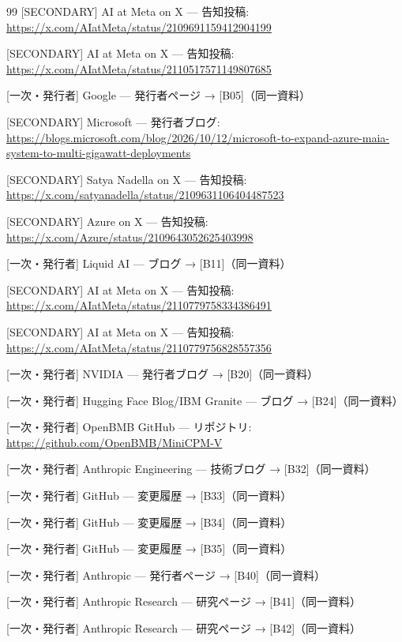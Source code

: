 \documentclass[lualatex,a4paper,10pt]{jlreq}
\begin{document}
\begin{thebibliography}{99}
 [SECONDARY] AI at Meta on X — 告知投稿: \url{https://x.com/AIatMeta/status/2109691159412904199}

 [SECONDARY] AI at Meta on X — 告知投稿: \url{https://x.com/AIatMeta/status/2110517571149807685}

 [一次・発行者] Google — 発行者ページ → [B05]（同一資料）

 [SECONDARY] Microsoft — 発行者ブログ: \url{https://blogs.microsoft.com/blog/2026/10/12/microsoft-to-expand-azure-maia-system-to-multi-gigawatt-deployments}

 [SECONDARY] Satya Nadella on X — 告知投稿: \url{https://x.com/satyanadella/status/2109631106404487523}

 [SECONDARY] Azure on X — 告知投稿: \url{https://x.com/Azure/status/2109643052625403998}

 [一次・発行者] Liquid AI — ブログ → [B11]（同一資料）

 [SECONDARY] AI at Meta on X — 告知投稿: \url{https://x.com/AIatMeta/status/2110779758334386491}

 [SECONDARY] AI at Meta on X — 告知投稿: \url{https://x.com/AIatMeta/status/2110779756828557356}

 [一次・発行者] NVIDIA — 発行者ブログ → [B20]（同一資料）

 [一次・発行者] Hugging Face Blog/IBM Granite — ブログ → [B24]（同一資料）

 [一次・発行者] OpenBMB GitHub — リポジトリ: \url{https://github.com/OpenBMB/MiniCPM-V}

 [一次・発行者] Anthropic Engineering — 技術ブログ → [B32]（同一資料）

 [一次・発行者] GitHub — 変更履歴 → [B33]（同一資料）

 [一次・発行者] GitHub — 変更履歴 → [B34]（同一資料）

 [一次・発行者] GitHub — 変更履歴 → [B35]（同一資料）

 [一次・発行者] Anthropic — 発行者ページ → [B40]（同一資料）

 [一次・発行者] Anthropic Research — 研究ページ → [B41]（同一資料）

 [一次・発行者] Anthropic Research — 研究ページ → [B42]（同一資料）


\end{thebibliography}
\end{document}
